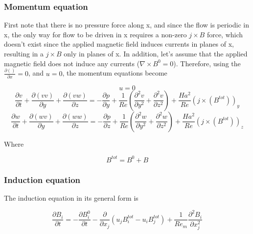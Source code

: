 \documentclass[11pt]{article}
\begin{document}
\subsubsection{Momentum equation}

First note that there is no pressure force along x, and since the flow is periodic in x, the only way for flow to be driven in x requires a non-zero $j\times B$ force, which doesn't exist since the applied magnetic field induces currents in planes of x, resulting in a $j\times B$ only in planes of x. In addition, let's assume that the applied magnetic field does not induce any currents ($\nabla \times B^0=0$). Therefore, using the $\frac{\partial ()}{\partial x} = 0$, and $u = 0$, the momentum equations become

\begin{equation}
	u=0
\end{equation}
\begin{equation}
	\frac{\partial v}{\partial t} 
	+ \frac{\partial (v v)}{\partial y}
	+ \frac{\partial (v w)}{\partial z}
	= 
	- \frac{\partial p}{\partial y}
	+ \frac{1}{Re}
	\left(
	\frac{\partial^2 v}{\partial y^2}
	+\frac{\partial^2 v}{\partial z^2}
	\right)
	+ \frac{Ha^2}{Re}
	(j \times (B^{tot}))_y
\end{equation}
\begin{equation}
	\frac{\partial w}{\partial t} 
	+ \frac{\partial (w v)}{\partial y}
	+ \frac{\partial (w w)}{\partial z}
	= 
	- \frac{\partial p}{\partial z}
	+ \frac{1}{Re}
	\left(
	\frac{\partial^2 w}{\partial y^2}
	+\frac{\partial^2 w}{\partial z^2}
	\right)
	+ \frac{Ha^2}{Re}
	(j \times (B^{tot}))_z
\end{equation}

Where

\begin{equation}
	B^{tot} = B^0 + B
\end{equation}

\subsubsection{Induction equation}

The induction equation in its general form is

\begin{equation}
	\frac{\partial B_i}{\partial t} 
	=
	- \frac{\partial B_i^0}{\partial t} 
	- \frac{\partial}{\partial x_j} (u_j B_i^{tot} - u_i B_j^{tot}) 
	+
	\frac{1}{Re_m}
	\frac{\partial^2 B_i}{\partial x_j^2}
\end{equation}
\end{document}
